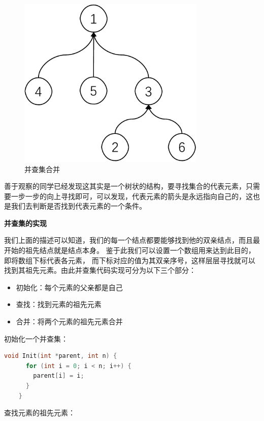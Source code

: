 \documentclass[lang=cn,newtx,10pt,scheme=chinese]{elegantbook}
\begin{document}
\begin{figure}[h!]
  \centering
  \includegraphics[width=0.8\textwidth]{./figure/pdf/cropped/unionFindExample(e).pdf}
  \caption{并查集合并}
  \label{fig:unionFind5}
\end{figure}

善于观察的同学已经发现这其实是一个树状的结构，要寻找集合的代表元素，只需要一步一步的向上寻找即可，可以发现，代表元素的箭头是永远指向自己的，这也是我们去判断是否找到代表元素的一个条件。

\textbf{并查集的实现}

我们上面的描述可以知道，我们的每一个结点都要能够找到他的双亲结点，而且最开始的祖先结点就是结点本身。
鉴于此我们可以设置一个数组用来达到此目的，即将数组下标代表各元素，
而下标对应的值为其双亲序号，这样层层寻找就可以找到其祖先元素。由此并查集代码实现可分为以下三个部分：

\begin{itemize}
  \item 初始化：每个元素的父亲都是自己
  \item 查找：找到元素的祖先元素
  \item 合并：将两个元素的祖先元素合并
  \end{itemize}

  初始化一个并查集：

  \begin{lstlisting}[language=C++, caption={并查集初始化}]
    void Init(int *parent, int n) {
      for (int i = 0; i < n; i++) {
        parent[i] = i;
      }
    }
  \end{lstlisting}

  查找元素的祖先元素：
\end{document}

